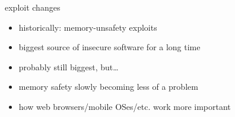 \begin{frame}{exploit changes}
    \begin{itemize}
    \item historically: memory-unsafety exploits
    \item biggest source of insecure software for a long time
    \item probably still biggest, but\ldots
    \vspace{.5cm}
    \item memory safety slowly becoming less of a problem
    \item how web browsers/mobile OSes/etc. work more important
    \end{itemize}
\end{frame}
